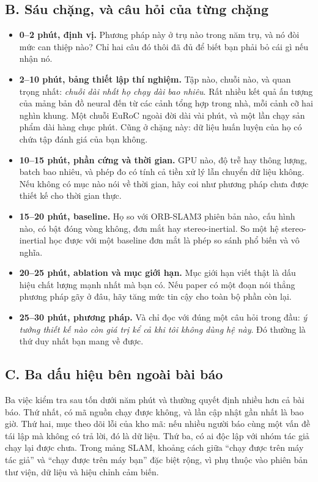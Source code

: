 \documentclass[../../deep_learning.tex]{subfiles}
\begin{document}
\subsection{B. Sáu chặng, và câu hỏi của từng chặng}
\begin{itemize}
\item \textbf{0--2 phút, định vị.} Phương pháp này ở trụ nào trong năm trụ, và nó đòi mức can thiệp nào? Chỉ hai câu đó thôi đã đủ để biết bạn phải bỏ cái gì nếu nhận nó.
\item \textbf{2--10 phút, bảng thiết lập thí nghiệm.} Tập nào, chuỗi nào, và quan trọng nhất: \emph{chuỗi dài nhất họ chạy dài bao nhiêu}. Rất nhiều kết quả ấn tượng của mảng bản đồ neural đến từ các cảnh tổng hợp trong nhà, mỗi cảnh cỡ hai nghìn khung. Một chuỗi EuRoC ngoài đời dài vài phút, và một lần chạy sản phẩm dài hàng chục phút. Cũng ở chặng này: dữ liệu huấn luyện của họ có chứa tập đánh giá của bạn không.
\item \textbf{10--15 phút, phần cứng và thời gian.} GPU nào, độ trễ hay thông lượng, batch bao nhiêu, và phép đo có tính cả tiền xử lý lẫn chuyển dữ liệu không. Nếu không có mục nào nói về thời gian, hãy coi như phương pháp chưa được thiết kế cho thời gian thực.
\item \textbf{15--20 phút, baseline.} Họ so với ORB-SLAM3 phiên bản nào, cấu hình nào, có bật đóng vòng không, đơn mắt hay stereo-inertial. So một hệ stereo-inertial học được với một baseline đơn mắt là phép so sánh phổ biến và vô nghĩa.
\item \textbf{20--25 phút, ablation và mục giới hạn.} Mục giới hạn viết thật là dấu hiệu chất lượng mạnh nhất mà bạn có. Nếu paper có một đoạn nói thẳng phương pháp gãy ở đâu, hãy tăng mức tin cậy cho toàn bộ phần còn lại.
\item \textbf{25--30 phút, phương pháp.} Và chỉ đọc với đúng một câu hỏi trong đầu: \emph{ý tưởng thiết kế nào còn giá trị kể cả khi tôi không dùng hệ này}. Đó thường là thứ duy nhất bạn mang về được.
\end{itemize}

\subsection{C. Ba dấu hiệu bên ngoài bài báo}
Ba việc kiểm tra sau tốn dưới năm phút và thường quyết định nhiều hơn cả bài báo. Thứ nhất, có mã nguồn chạy được không, và lần cập nhật gần nhất là bao giờ. Thứ hai, mục theo dõi lỗi của kho mã: nếu nhiều người báo cùng một vấn đề tái lập mà không có trả lời, đó là dữ liệu. Thứ ba, có ai độc lập với nhóm tác giả chạy lại được chưa. Trong mảng SLAM, khoảng cách giữa ``chạy được trên máy tác giả'' và ``chạy được trên máy bạn'' đặc biệt rộng, vì phụ thuộc vào phiên bản thư viện, dữ liệu và hiệu chỉnh cảm biến.
\end{document}
